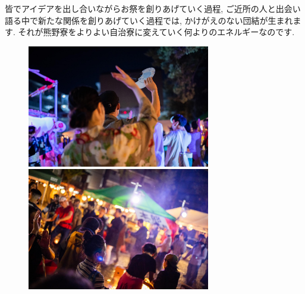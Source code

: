 皆でアイデアを出し合いながらお祭を創りあげていく過程, ご近所の人と出会い語る中で新たな関係を創りあげていく過程では, かけがえのない団結が生まれます. それが熊野寮をよりよい自治寮に変えていく何よりのエネルギーなのです.




\begin{figure}[H]
  \begin{minipage}[H]{.5\textwidth}
    \centering
    \includegraphics[width=8cm]{gazo/kumanomaturi2.jpg}
  \end{minipage}
  \begin{minipage}[H]{.5\textwidth}
    \centering
    \includegraphics[width=8cm]{gazo/kumanomaturi3.jpg}
  \end{minipage}
\end{figure}

